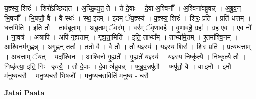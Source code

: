 \documentclass[17pt]{extarticle}
\begin{document}
य॒ज्ञ्स्य॒ शिरः॑ । शिरो᳚ऽच्छिद्यत । अ॒च्छि॒द्य॒त॒ ते । ते दे॒वाः । दे॒वा अ॒श्विनौ᳚ । अ॒श्विना॑वब्रुवन्न् । अ॒ब्रु॒व॒न् भि॒षजौ᳚ । भि॒षजौ॒ वै । वै स्थः॑ । स्थ॒ इ॒दम् । इ॒दम् ॅय॒ज्ञ्स्य॑ । य॒ज्ञ्स्य॒ शिरः॑ । शिरः॒ प्रति॑ । प्रति॑ धत्तम् । ध॒त्त॒मिति॑ । इति॒ तौ । ताव॑ब्रूताम् । अ॒ब्रू॒ता॒म् ॅवर᳚म् । वर॑म् ॅवृणावहै । वृ॒णा॒व॒है॒ ग्रहः॑ । ग्रह॑ ए॒व । ए॒व नौ᳚ । ना॒वत्र॑ । अत्रापि॑ । अपि॑ गृह्यताम् । गृ॒ह्य॒ता॒मिति॑ । इति॒ ताभ्या᳚म् । ताभ्या॑मे॒तम् । ए॒तमा᳚श्वि॒नम् । आ॒श्वि॒नम॑गृह्णन्न् । अ॒गृ॒ह्ण॒न् ततः॑ । ततो॒ वै । वै तौ । तौ य॒ज्ञ्स्य॑ । य॒ज्ञ्स्य॒ शिरः॑ । शिरः॒ प्रति॑ । प्रत्य॑धत्ताम् । अ॒ध॒त्ता॒म् ॅयत् । यदा᳚श्वि॒नः । आ॒श्वि॒नो गृ॒ह्यते᳚ । गृ॒ह्यते॑ य॒ज्ञ्स्य॑ । य॒ज्ञ्स्य॒ निष्कृ॑त्यै । निष्कृ॑त्यै॒ तौ । निष्कृ॑त्या॒ इति॒ निः - कृ॒त्यै॒ । तौ दे॒वाः । दे॒वा अ॑ब्रुवन्न् । अ॒ब्रु॒व॒न्नपू॑तौ । अपू॑तौ॒ वै । वा इ॒मौ । इ॒मौ म॑नुष्यच॒रौ । म॒नु॒ष्य॒च॒रौ भि॒षजौ᳚ । म॒नु॒ष्य॒च॒राविति॑ मनुष्य - च॒रौ \newline

\textbf{Jatai Paata} \newline
\end{document}
